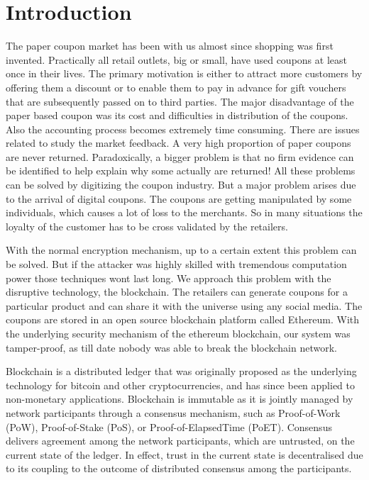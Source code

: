 \chapter{Introduction}
\par
The paper coupon market has been with us almost since shopping was 
first invented. Practically all retail outlets, big or small, have used coupons at least
once in their lives. The primary motivation is either to attract more customers by
offering them a discount or to enable them to pay in advance for gift vouchers that
are subsequently passed on to third parties. The major disadvantage of the paper
based coupon was its cost and difficulties in distribution of the coupons. Also the
accounting process becomes extremely time consuming. There are issues related
to study the market feedback. A very high proportion of paper coupons are never
returned. Paradoxically, a bigger problem is that no firm evidence can be identified
to help explain why some actually are returned! All these problems can be solved
by digitizing the coupon industry. But a major problem arises due to the arrival of
digital coupons. The coupons are getting manipulated by some individuals, which
causes a lot of loss to the merchants. So in many situations the loyalty of the
customer has to be cross validated by the retailers.
\par
With the normal encryption mechanism, up to a certain extent this problem
can be solved. But if the attacker was highly skilled with tremendous computation
power those techniques wont last long. We approach this problem with the disruptive
technology, the blockchain. The retailers can generate coupons for a particular
product and can share it with the universe using any social media. The coupons are
stored in an open source blockchain platform called Ethereum. With the underlying
security mechanism of the ethereum blockchain, our system was tamper-proof, as
till date nobody was able to break the blockchain network.
\par
Blockchain is a distributed ledger that was originally
proposed as the underlying technology for bitcoin and other cryptocurrencies, 
and has since been applied to non-monetary applications.
Blockchain is immutable as it is jointly managed by network participants
through a consensus mechanism, such as Proof-of-Work
(PoW), Proof-of-Stake (PoS), or Proof-of-ElapsedTime (PoET). 
Consensus delivers agreement among
the network participants, which are untrusted, on the
current state of the ledger. In effect, trust in the current
state is decentralised due to its coupling to the outcome
of distributed consensus among the participants.